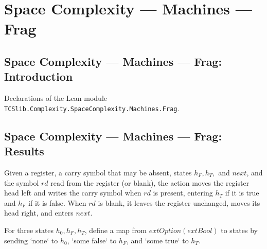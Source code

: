 \section{Space Complexity --- Machines --- Frag}
\subsection*{Space Complexity --- Machines --- Frag: Introduction}

Declarations of the Lean module \texttt{TCSlib.Complexity.SpaceComplexity.Machines.Frag}.

\subsection*{Space Complexity --- Machines --- Frag: Results}

\begin{definition}
\label{Complexity.LogProg.halfLAct}
\leanok
{}
Given a register, a carry symbol that may be absent, states $h_F,h_T,$ and $next$, and
the symbol $rd$ read from the register (or blank), the action moves the register head
left and writes the carry symbol when $rd$ is present, entering $h_T$ if it is true and
$h_F$ if it is false. When $rd$ is blank, it leaves the register unchanged, moves its
head right, and enters $next$.
\end{definition}

\begin{definition}
\label{Complexity.LogProg.halfSt}
\leanok
For three states $h_0,h_F,h_T$, define a map from $	ext{Option}(	ext{Bool})$ to states
by sending `none` to $h_0$, `some false` to $h_F$, and `some true` to $h_T$.
\end{definition}

